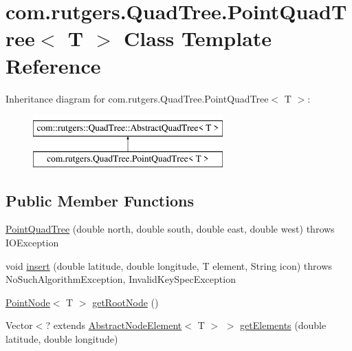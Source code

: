\hypertarget{classcom_1_1rutgers_1_1QuadTree_1_1PointQuadTree}{}\section{com.\+rutgers.\+Quad\+Tree.\+Point\+Quad\+Tree$<$ T $>$ Class Template Reference}
\label{classcom_1_1rutgers_1_1QuadTree_1_1PointQuadTree}
Inheritance diagram for com.\+rutgers.\+Quad\+Tree.\+Point\+Quad\+Tree$<$ T $>$\+:\begin{figure}[H]
\begin{center}
\leavevmode
\includegraphics[height=2.000000cm]{classcom_1_1rutgers_1_1QuadTree_1_1PointQuadTree}
\end{center}
\end{figure}
\subsection*{Public Member Functions}
\begin{DoxyCompactItemize}
\item 
\hyperlink{classcom_1_1rutgers_1_1QuadTree_1_1PointQuadTree_a0f0ff8a241617971f6e96d2e2ffe9a1f}{Point\+Quad\+Tree} (double north, double south, double east, double west)  throws I\+O\+Exception 
\item 
void \hyperlink{classcom_1_1rutgers_1_1QuadTree_1_1PointQuadTree_af18b98ffc4fa1a7c2e803db8c8f59392}{insert} (double latitude, double longitude, T element, String icon)  throws No\+Such\+Algorithm\+Exception, Invalid\+Key\+Spec\+Exception 
\item 
\hyperlink{classcom_1_1rutgers_1_1QuadTree_1_1PointNode}{Point\+Node}$<$ T $>$ \hyperlink{classcom_1_1rutgers_1_1QuadTree_1_1PointQuadTree_a7038d1d0c8f55c00b38bbd440c31e9aa}{get\+Root\+Node} ()
\item 
Vector$<$? extends \hyperlink{classcom_1_1rutgers_1_1QuadTree_1_1AbstractNodeElement}{Abstract\+Node\+Element}$<$ T $>$ $>$ \hyperlink{classcom_1_1rutgers_1_1QuadTree_1_1PointQuadTree_a9968a70d79ddfe49dc2dac031389648f}{get\+Elements} (double latitude, double longitude)
\end{DoxyCompactItemize}


